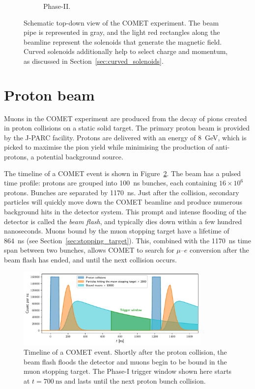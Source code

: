 \begin{figure}
\begin{subfigure}[b]{0.49\textwidth}
        \caption{Phase-II.}
    \end{subfigure}
    \caption{ Schematic top-down view of the COMET experiment. The beam pipe is
    represented in gray, and the light red rectangles along the beamline
    represent the solenoids that generate the magnetic field. Curved solenoids
    additionally help to select charge and momentum, as discussed in
    Section~\ref{sec:curved_solenoids}.}
    \label{fig:comet_schematic}
\end{figure}



\section{Proton beam}\label{sec:COMET_beam}

Muons in the COMET experiment are produced from the decay of pions created in
proton collisions on a static solid target. The primary proton beam is provided
by the J-PARC facility. Protons are delivered with an energy of \SI{8}{\GeV},
which is picked to maximise the pion yield while minimising the production of
anti-protons, a potential background source.

The timeline of a COMET event is shown in Figure~\ref{fig:timing_distributions}.
The beam has a pulsed time profile: protons are grouped into \SI{100}{\ns}
bunches, each containing $16\times 10^6$ protons. Bunches are separated by
\SI{1170}{\ns}. Just after the collision, secondary particles will quickly move
down the COMET beamline and produce numerous background hits in the detector
system. This prompt and intense flooding of the detector is called the
\emph{beam flash}, and typically dies down within a few hundred nanoseconds.
Muons bound by the muon stopping target have a lifetime of \SI{864}{\ns} (see
Section~\ref{sec:stopping_target}). This, combined with the \SI{1170}{\ns} time
span between two bunches, allows COMET to search for $\mu$--$e$ conversion after
the beam flash has ended, and until the next collision occurs. 

\begin{figure}
    \centering
    \includegraphics[width=0.85\textwidth]{chapter2/timing_plot_realistic_beam_flash.pdf}
    \caption{ Timeline of a COMET event. Shortly after the proton collision, the
        beam flash floods the detector and muons begin to be bound in the muon
        stopping target. The Phase-I trigger window shown here starts at
        $t=\SI{700}{\ns}$ and lasts until the next proton bunch collision.  }
    \label{fig:timing_distributions}
\end{figure}

